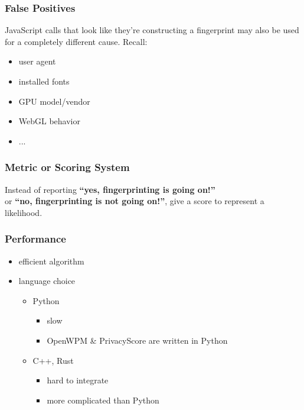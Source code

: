 \documentclass{beamer}
\begin{document}

\begin{frame}
    \frametitle{False Positives}
    JavaScript calls that look like they're constructing a fingerprint may also be
    used for a completely different cause. Recall:
    \begin{itemize}
        \item user agent
        \item installed fonts
        \item GPU model/vendor
        \item WebGL behavior
        \item ...
    \end{itemize}
\end{frame}


\begin{frame}
    \frametitle{Metric or Scoring System}
    Instead of reporting \textbf{``yes, fingerprinting is going on!''} \\
    or \textbf{``no, fingerprinting is not going on!''}, give a score
    to represent a likelihood.
\end{frame}


\begin{frame}
    \frametitle{Performance}
    \begin{itemize}
        \item efficient algorithm
        \item language choice
        \begin{itemize}
            \item Python
            \begin{itemize}
                \item slow
                \item OpenWPM \& PrivacyScore are written in Python
            \end{itemize}
            \item C++, Rust
            \begin{itemize}
                \item hard to integrate
                \item more complicated than Python
            \end{itemize}
        \end{itemize}
    \end{itemize}
\end{frame}
\end{document}

